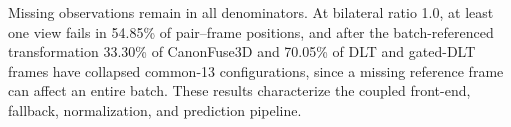 Missing observations remain in all denominators. At bilateral ratio 1.0, at least one view fails in 54.85\% of pair--frame positions, and after the batch-referenced transformation 33.30\% of CanonFuse3D and 70.05\% of DLT and gated-DLT frames have collapsed common-13 configurations, since a missing reference frame can affect an entire batch. These results characterize the coupled front-end, fallback, normalization, and prediction pipeline.

\FloatBarrier
